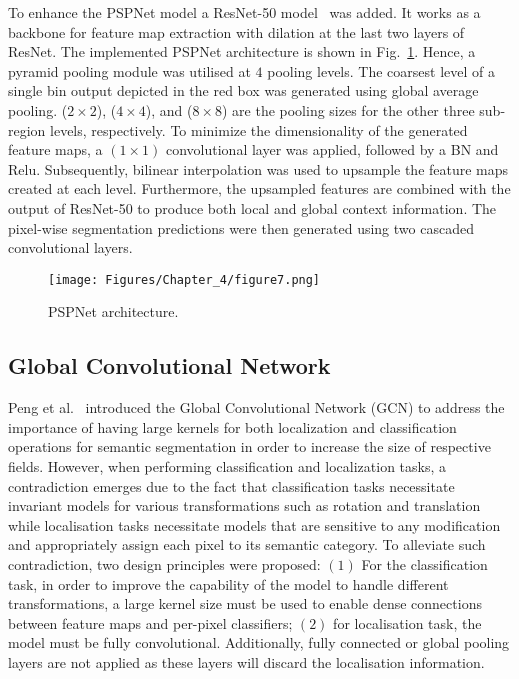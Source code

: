 To enhance the PSPNet model a ResNet-50 model~\cite{He2016} was added. 
It works as a backbone for feature map extraction with dilation at the last two layers of ResNet. 
The implemented PSPNet architecture is shown in Fig.~\ref{fig:PSPNet}.
Hence, a pyramid pooling module was utilised at \(4\) pooling levels.
The coarsest level of a single bin output depicted in the red box was generated using global average pooling.
(\(2\times2\)), (\(4\times 4\)), and (\(8\times8\)) are the pooling sizes for the other three sub-region levels, respectively.
To minimize the dimensionality of the generated feature maps, a \((1\times 1)\) convolutional layer was applied, followed by a BN and Relu.
Subsequently, bilinear interpolation was used to upsample the feature maps created at each level.
Furthermore, the upsampled features are combined with the output of ResNet-50 to produce both local and global context information.
The pixel-wise segmentation predictions were then generated using two cascaded convolutional layers. 
\begin{figure} [h!]
	\centering
	\texttt{[image: Figures/Chapter\_4/figure7.png]}
	\caption{PSPNet architecture.} 
	\label{fig:PSPNet}
\end{figure} 
\subsection{Global Convolutional Network}
\label{sec436}
Peng et al.~\cite{Peng2017} introduced the Global Convolutional Network (GCN) to address the importance of having large kernels for both localization and classification operations for semantic segmentation in order to increase the size of respective fields.
However, when performing classification and localization tasks, a contradiction emerges due to the fact that classification tasks necessitate invariant models for various transformations such as rotation and translation while localisation tasks necessitate models that are sensitive to any modification and appropriately assign each pixel to its semantic category.
To alleviate such contradiction, two design principles were proposed:
\((1)\) For the classification task, in order to improve the capability of 
the model to handle different transformations, a large kernel size must be 
used to enable dense connections between feature maps and per-pixel 
classifiers; \((2)\) for localisation task, the model must be fully convolutional. 
Additionally, fully connected or global pooling layers are not applied as 
these layers will discard the localisation information. 

